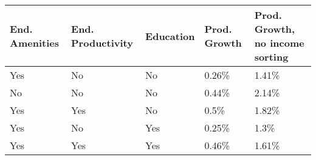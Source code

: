 \begin{table}[!htbp] \centering \renewcommand*{\arraystretch}{1.1}
\begin{tabular}{lllll}
\hline
\hline
End. Amenities & End. Productivity & Education & Prod. Growth & Prod. Growth, no income sorting \\ 
\hline
Yes & No & No & 0.26\% & 1.41\% \\ 
No & No & No & 0.44\% & 2.14\% \\ 
Yes & Yes & No & 0.5\% & 1.82\% \\ 
Yes & No & Yes & 0.25\% & 1.3\% \\ 
Yes & Yes & Yes & 0.46\% & 1.61\%\\ 
\hline
\hline
\end{tabular}
\end{table}

